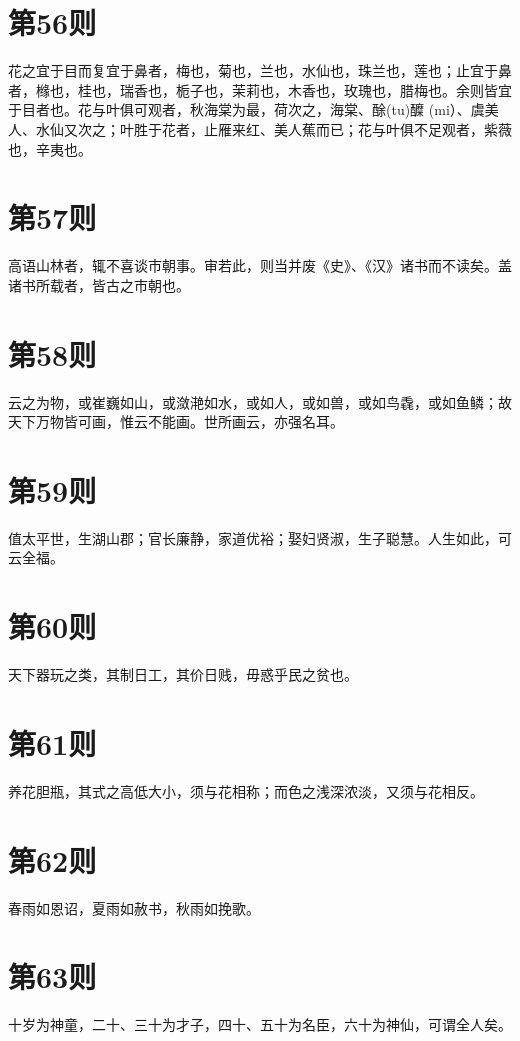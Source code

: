 \documentclass[12pt,a4paper]{ctexbook}
\begin{document}
\section{第56则}
花之宜于目而复宜于鼻者，梅也，菊也，兰也，水仙也，珠兰也，莲也；止宜于鼻者，橼也，桂也，瑞香也，栀子也，茉莉也，木香也，玫瑰也，腊梅也。余则皆宜于目者也。花与叶俱可观者，秋海棠为最，荷次之，海棠、酴(tu)醾 (mi）、虞美人、水仙又次之；叶胜于花者，止雁来红、美人蕉而已；花与叶俱不足观者，紫薇也，辛夷也。\par

\section{第57则}
高语山林者，辄不喜谈市朝事。审若此，则当并废《史》、《汉》诸书而不读矣。盖诸书所载者，皆古之市朝也。\par

\section{第58则}
云之为物，或崔巍如山，或潋滟如水，或如人，或如兽，或如鸟毳，或如鱼鳞；故天下万物皆可画，惟云不能画。世所画云，亦强名耳。\par

\section{第59则}
值太平世，生湖山郡；官长廉静，家道优裕；娶妇贤淑，生子聪慧。人生如此，可云全福。\par

\section{第60则}
天下器玩之类，其制日工，其价日贱，毋惑乎民之贫也。\par

\section{第61则}
养花胆瓶，其式之高低大小，须与花相称；而色之浅深浓淡，又须与花相反。\par

\section{第62则}
春雨如恩诏，夏雨如赦书，秋雨如挽歌。\par

\section{第63则}
十岁为神童，二十、三十为才子，四十、五十为名臣，六十为神仙，可谓全人矣。\par
\end{document}

